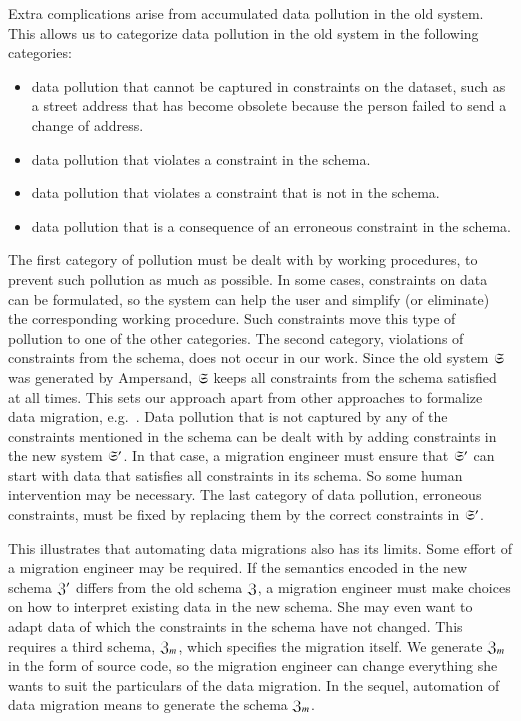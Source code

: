 \documentclass{elsarticle}
\begin{document}
   Extra complications arise from accumulated data pollution in the old system.
   This allows us to categorize data pollution in the old system in the following categories:
   \begin{itemize}
      \item data pollution that cannot be captured in constraints on the dataset,
      such as a street address that has become obsolete because the person failed to send a change of address.
      \item data pollution that violates a constraint in the schema.
      \item data pollution that violates a constraint that is not in the schema.
      \item data pollution that is a consequence of an erroneous constraint in the schema.
   \end{itemize}
   The first category of pollution must be dealt with by working procedures, to prevent such pollution as much as possible.
   In some cases, constraints on data can be formulated,
   so the system can help the user and simplify (or eliminate) the corresponding working procedure.
   Such constraints move this type of pollution to one of the other categories.
   The second category, violations of constraints from the schema, does not occur in our work.
   Since the old system $\mathfrak{S}$ was generated by Ampersand,
   $\mathfrak{S}$ keeps all constraints from the schema satisfied at all times.
   This sets our approach apart from other approaches to formalize data migration, e.g.~\cite{Thalheim2013}.
   Data pollution that is not captured by any of the constraints mentioned in the schema
   can be dealt with by adding constraints in the new system $\mathfrak{S}'$.
   In that case, a migration engineer must ensure that $\mathfrak{S}'$ can start with data that satisfies all constraints in its schema.
   So some human intervention may be necessary.
   The last category of data pollution, erroneous constraints, must be fixed by replacing them by the correct constraints in $\mathfrak{S}'$.

   This illustrates that automating data migrations also has its limits.
   Some effort of a migration engineer may be required.
   If the semantics encoded in the new schema $\mathfrak{Z}'$ differs from the old schema $\mathfrak{Z}$,
   a migration engineer must make choices on how to interpret existing data in the new schema.
   She may even want to adapt data of which the constraints in the schema have not changed.
   This requires a third schema, $\mathfrak{Z}_m$, which specifies the migration itself.
   We generate $\mathfrak{Z}_m$ in the form of source code, so the migration engineer can change everything she wants to suit the particulars of the data migration.
   In the sequel, automation of data migration means to generate the schema $\mathfrak{Z}_m$.
\end{document}
